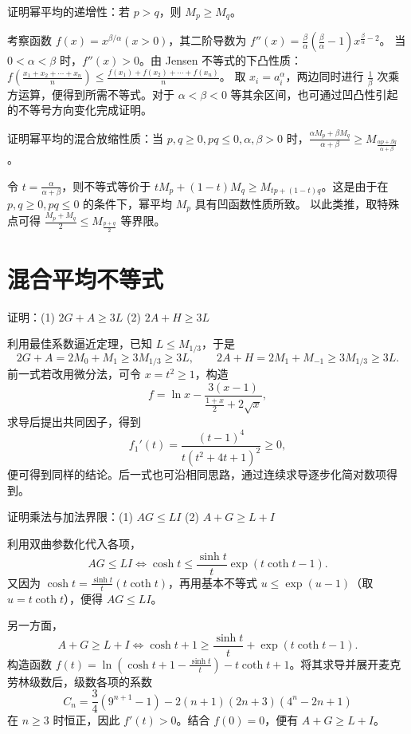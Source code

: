 \begin{example}
证明幂平均的递增性：若 $p > q$，则 $M_p \ge M_q$。
\end{example}
\begin{solution}
考察函数 $f(x) = x^{\beta/\alpha} (x>0)$，其二阶导数为 $f''(x) = \frac{\beta}{\alpha}\left(\frac{\beta}{\alpha}-1\right)x^{\frac{\beta}{\alpha}-2}$。
当 $0<\alpha<\beta$ 时，$f''(x) > 0$。由 Jensen 不等式的下凸性质：
$f\left(\frac{x_1+x_2+\cdots+x_n}{n}\right) \le \frac{f(x_1)+f(x_2)+\cdots+f(x_n)}{n}$。
取 $x_i = a_i^\alpha$，两边同时进行 $\frac{1}{\beta}$ 次乘方运算，便得到所需不等式。对于 $\alpha<\beta<0$ 等其余区间，也可通过凹凸性引起的不等号方向变化完成证明。
\end{solution}

\begin{example}
证明幂平均的混合放缩性质：当 $p, q \ge 0, pq \le 0, \alpha, \beta > 0$ 时，$\frac{\alpha M_p + \beta M_q}{\alpha+\beta} \ge M_{\frac{\alpha p + \beta q}{\alpha+\beta}}$。
\end{example}
\begin{solution}
令 $t = \frac{\alpha}{\alpha+\beta}$，则不等式等价于 $tM_p + (1-t)M_q \ge M_{tp+(1-t)q}$。这是由于在 $p,q \ge 0, pq \le 0$ 的条件下，幂平均 $M_p$ 具有凹函数性质所致。
以此类推，取特殊点可得 $\frac{M_p+M_q}{2} \le M_{\frac{p+q}{2}}$ 等界限。
\end{solution}

\section{混合平均不等式}

\begin{example}
证明：(1) $2G+A \ge 3L$ \qquad (2) $2A+H \ge 3L$
\end{example}
\begin{solution}
利用最佳系数逼近定理，已知 $L \le M_{1/3}$，于是
\[
2G+A = 2M_0 + M_1 \ge 3M_{1/3} \ge 3L,\qquad
2A+H = 2M_1 + M_{-1} \ge 3M_{1/3} \ge 3L.
\]
前一式若改用微分法，可令 $x=t^2 \ge 1$，构造
\[
f = \ln x - \frac{3(x-1)}{\frac{1+x}{2} + 2\sqrt{x}},
\]
求导后提出共同因子，得到
\[
f_1'(t) = \frac{(t-1)^4}{t(t^2+4t+1)^2} \ge 0,
\]
便可得到同样的结论。后一式也可沿相同思路，通过连续求导逐步化简对数项得到。
\end{solution}

\begin{example}
证明乘法与加法界限：(1) $AG \le LI$ \qquad (2) $A+G \ge L+I$
\end{example}
\begin{solution}
利用双曲参数化代入各项，
\[
AG \le LI \iff \cosh t \le \frac{\sinh t}{t} \exp(t\coth t - 1).
\]
又因为 $\cosh t = \frac{\sinh t}{t}(t\coth t)$，再用基本不等式 $u \le \exp(u-1)$（取 $u = t\coth t$），便得 $AG \le LI$。

另一方面，
\[
A+G \ge L+I \iff \cosh t + 1 \ge \frac{\sinh t}{t} + \exp(t\coth t - 1).
\]
构造函数 $f(t) = \ln\left(\cosh t + 1 - \frac{\sinh t}{t}\right) - t\coth t + 1$。将其求导并展开麦克劳林级数后，级数各项的系数
\[
C_n = \frac{3}{4}(9^{n+1}-1) - 2(n+1)(2n+3)(4^n-2n+1)
\]
在 $n \ge 3$ 时恒正，因此 $f'(t) > 0$。结合 $f(0)=0$，便有 $A+G \ge L+I$。
\end{solution}

